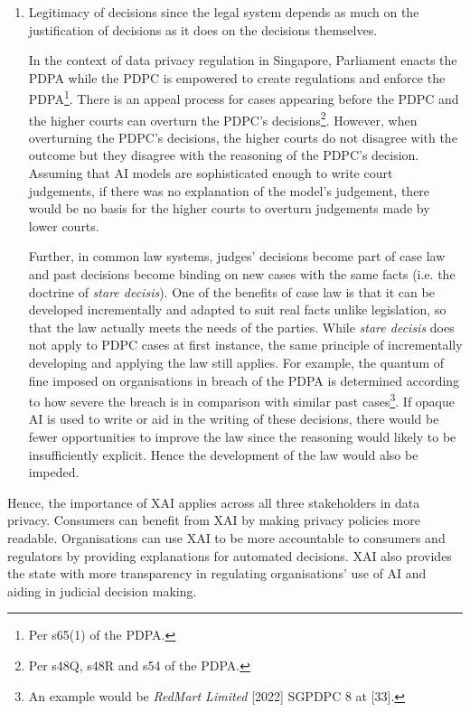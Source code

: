 \begin{enumerate}
  \item Legitimacy of decisions since the legal system depends as much on the justification of decisions as it does on the decisions themselves.
  
  In the context of data privacy regulation in Singapore, Parliament enacts the PDPA while the PDPC is empowered to create regulations and enforce the PDPA\footnote{Per s65(1) of the PDPA.}. There is an appeal process for cases appearing before the PDPC and the higher courts can overturn the PDPC's decisions\footnote{Per s48Q, s48R and s54 of the PDPA.}. However, when overturning the PDPC's decisions, the higher courts do not disagree with the outcome but they disagree with the reasoning of the PDPC's decision. Assuming that AI models are sophisticated enough to write court judgements, if there was no explanation of the model's judgement, there would be no basis for the higher courts to overturn judgements made by lower courts. 
  
  Further, in common law systems, judges' decisions become part of case law and past decisions become binding on new cases with the same facts (i.e. the doctrine of \textit{stare decisis}). One of the benefits of case law is that it can be developed incrementally and adapted to suit real facts unlike legislation, so that the law actually meets the needs of the parties. While \textit{stare decisis} does not apply to PDPC cases at first instance, the same principle of incrementally developing and applying the law still applies. For example, the quantum of fine imposed on organisations in breach of the PDPA is determined according to how severe the breach is in comparison with similar past cases\footnote{An example would be \textit{RedMart Limited} [2022] SGPDPC 8 at [33].}. If opaque AI is used to write or aid in the writing of these decisions, there would be fewer opportunities to improve the law since the reasoning would likely to be insufficiently explicit. Hence the development of the law would also be impeded.
\end{enumerate}

Hence, the importance of XAI applies across all three stakeholders in data privacy. Consumers can benefit from XAI by making privacy policies more readable. Organisations can use XAI to be more accountable to consumers and regulators by providing explanations for automated decisions. XAI also provides the state with more transparency in regulating organisations' use of AI and aiding in judicial decision making.

